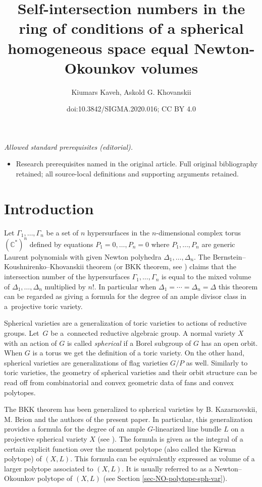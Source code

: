 \documentclass[10pt,a4paper]{amsart}
\title{Self-intersection numbers in the ring of conditions of a spherical homogeneous space equal Newton-Okounkov volumes}
\author{Kiumars Kaveh, Askold G. Khovanskii}
\date{doi:10.3842/SIGMA.2020.016; CC BY 4.0}
\numberwithin{equation}{section}
\theoremstyle{definition}
\begin{document}
\maketitle
\noindent\textit{Allowed standard prerequisites (editorial).}\begin{itemize}
\item Research prerequisites named in the original article. Full original bibliography retained; all source-local definitions and supporting arguments retained.
\end{itemize}\medskip
\section{Introduction}
Let $\Gamma_1,\ldots,\Gamma_n$ be a set of $n$ hypersurfaces in the $n$-dimensional complex torus $(\mathbb C^*)^n$ defined by equations $P_1=0,\ldots, P_n = 0$ where $P_1,\ldots,P_n$ are generic Laurent polynomials with given Newton polyhedra $\Delta_1,\ldots,\Delta_n$. The Bernstein--Koushnirenko--Khovanskii theorem (or BKK theorem, see \cite{Bernstein, Khovanskii-genus, Koushnirenko}) claims that the intersection number of the hypersurfaces $\Gamma_1,\ldots,\Gamma_n$ is equal to the mixed volume of $\Delta_1, \ldots, \Delta_n$ multiplied by $n!$. In particular when $\Delta_1=\cdots=\Delta_n=\Delta$ this theo\-rem can be regarded as giving a formula for the degree of an ample divisor class in a~projective toric variety.

Spherical varieties are a generalization of toric varieties to actions of reductive groups. Let~$G$ be a~connected reductive algebraic group. A normal variety $X$ with an action of $G$ is called {\it spherical} if a Borel subgroup of $G$ has an open orbit. When $G$ is a torus we get the definition of a toric variety. On the other hand, spherical varieties are generalizations of flag varieties $G/P$ as well. Similarly to toric varieties, the geometry of spherical varieties and their orbit structure can be read off from combinatorial and convex geometric data of fans and convex polytopes.

The BKK theorem has been generalized to spherical varieties by B. Kazarnovskii, M. Brion and the authors of the present paper. In particular, this generalization provides a formula for the degree of an ample $G$-linearized line bundle $L$ on a projective spherical variety $X$ (see \cite{Brion, Kazarnovskii, KKh-reductive}). The formula is given as the integral of a certain explicit function over the moment polytope (also called the Kirwan polytope) of $(X, L)$. This formula can be equivalently expressed as volume of a larger polytope associated to $(X, L)$. It is usually referred to as a Newton--Okounkov polytope of $(X, L)$ (see Section \ref{sec-NO-polytope-sph-var}).
\end{document}
